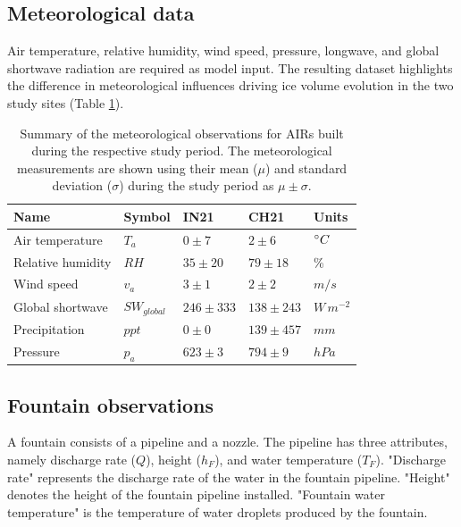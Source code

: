 \subsection{Meteorological data}

Air temperature, relative humidity, wind speed, pressure, longwave, and global shortwave radiation are required
as model input. The resulting dataset highlights the difference in meteorological influences driving ice
volume evolution in the two study sites (Table \ref{tab:Observations}).

\begin{table}
	\centering
	\caption{Summary of the meteorological observations for \ac{AIRs} built during the respective study period.
		The meteorological measurements are shown using their mean ($\mu$) and standard deviation ($\sigma$) during the study
		period as $\mu \pm \sigma$. }

	\label{tab:Observations}
	\begin{tabular}{|lllll|}
		\hline
		\textbf{Name}        & \textbf{Symbol} & \textbf{IN21} & \textbf{CH21} & \textbf{Units} \\ \hline
		Air temperature      & $T_a    $       & $0 \pm 7$     & $2 \pm 6$     & $^{\circ} C$    \\
		Relative humidity    & $RH     $       & $35 \pm 20$   & $79 \pm 18$   & \%             \\
		Wind speed           & $v_a        $   & $3 \pm 1$     & $2 \pm 2$     & $m/s$          \\
		Global shortwave     & $SW_{global} $  & $246 \pm 333$ & $138 \pm 243$  & $W\,m^{-2}$    \\
		Precipitation        & $ppt        $   & $0 \pm 0$     & $139 \pm 457$ & $mm$           \\
		Pressure             & $p_a         $  & $623 \pm 3$   & $794 \pm 9$   & $hPa$          \\\hline
	\end{tabular}
\end{table}

\subsection{Fountain observations}

A fountain consists of a pipeline and a nozzle. The pipeline has three attributes, namely discharge rate
($Q$), height ($h_F$), and water temperature ($T_F$). "Discharge rate" represents the discharge rate of the water in
the fountain pipeline. "Height" denotes the height of the fountain pipeline installed. "Fountain water temperature"
is the temperature of water droplets produced by the fountain.

